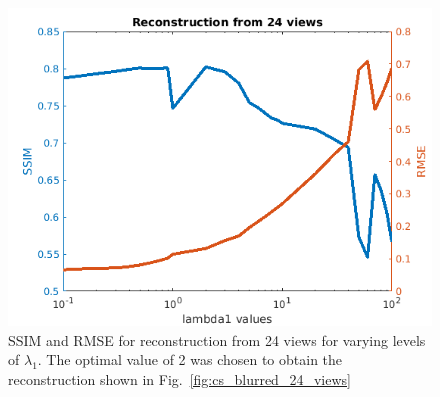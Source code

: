 \documentclass{article}
\begin{document}
\begin{figure}[!h]
\centering
       \includegraphics[width=\columnwidth]{../images/potato/2D/cs_blurred_results/SSIM_RMSE_24_angles.png}
\caption{SSIM and RMSE for reconstruction from 24 views for varying levels of $\lambda_1$. The optimal value of 2 was chosen to obtain the reconstruction shown in Fig.~\ref{fig:cs_blurred_24_views}}
\label{fig:ssim_rmse_24_views}
\end{figure}
\newpage
\end{document}
